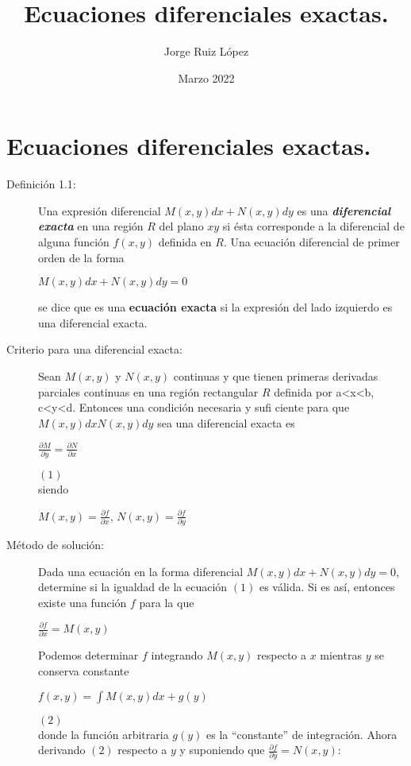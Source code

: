 \documentclass{article}
\title{Ecuaciones diferenciales exactas.}
\author{Jorge Ruiz López}
\affil{Facultad de Ingeniería UNAM}
\date{Marzo 2022}
\begin{document}
\maketitle

\section{Ecuaciones diferenciales exactas.}
\begin{description}
\item[Definición 1.1:]Una expresión diferencial $M(x, y) dx + N(x, y) dy$ es una \cite{zill}\textbf{\textit{ diferencial exacta}} en una región $R$ del plano $xy$ si ésta corresponde a la diferencial de alguna función $f (x, y)$ definida en $R$. Una ecuación diferencial de primer orden de la forma\begin{center}
     $M(x, y) dx + N(x, y) dy = 0$
\end{center}
se dice que es una \textbf{ecuación exacta } si la expresión del lado izquierdo es una diferencial exacta.
\item[Criterio para una diferencial exacta:]Sean $M(x, y)$ y $N(x, y)$ continuas y que tienen primeras derivadas parciales continuas en una región rectangular $R$ definida por a<x<b, c<y<d. Entonces una condición necesaria y sufi ciente para que $M(x, y) dx  N(x, y) dy$ sea una diferencial exacta es 
\begin{center}
    $\frac{\partial M}{\partial y} = \frac{\partial N}{\partial x}$
\end{center}\tab$(1)$\\
siendo\begin{center}
    $M(x,y) = \frac{\partial f}{\partial x}$, $N(x,y) = \frac{\partial f}{\partial y}$
\end{center}
\item[Método de solución:]Dada una ecuación en la forma diferencial $M(x, y) dx + N(x, y) dy = 0$, determine si la igualdad de la ecuación $(1)$ es válida. Si es así, entonces existe una función $f$ para la que
\begin{center}
    $ \frac{\partial f}{\partial x} =M(x,y)$
\end{center}
Podemos determinar $f$ integrando $M(x, y)$ respecto a $x$ mientras $y$ se conserva constante
\begin{center}
    $f(x,y) = \int M(x,y) dx + g(y)$
\end{center}\tab$(2)$\\
donde la función arbitraria $g(y)$ es la “constante” de integración. Ahora derivando $(2)$ respecto a $y$ y suponiendo que $\frac{\partial f}{\partial y} = N(x, y)$:

\end{description}
\end{document}
